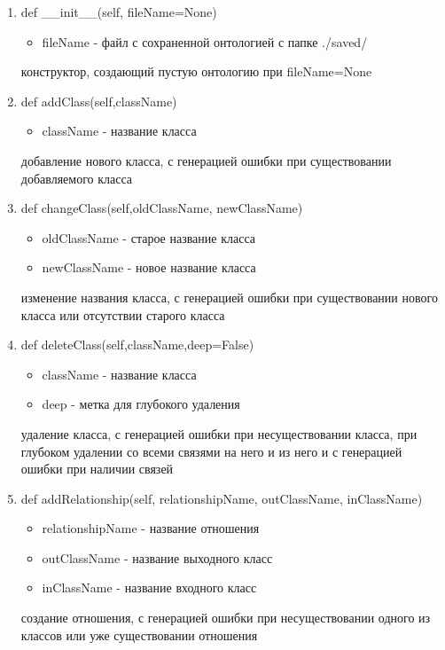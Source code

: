 \documentclass{article}
\begin{document}
	\begin{enumerate}
	\item def \_\_init\_\_(self, fileName=None)
		\begin{itemize}
			\item fileName - файл с сохраненной онтологией с папке ./saved/
		\end{itemize}
		конструктор, создающий пустую онтологию при fileName=None
	
	\item def addClass(self,className)
	\begin{itemize}
		\item className - название класса
	\end{itemize}
	добавление нового класса, с генерацией ошибки при существовании добавляемого класса
	
	\item def changeClass(self,oldClassName, newClassName)
	\begin{itemize}
		\item oldClassName - старое название класса
		\item newClassName - новое название класса
	\end{itemize}
	изменение названия класса, с генерацией ошибки при существовании нового класса или отсутствии старого класса
	
	\item def deleteClass(self,className,deep=False)
	\begin{itemize}
		\item className - название класса
		\item deep - метка для глубокого удаления
	\end{itemize}
	удаление класса, с генерацией ошибки при несуществовании класса, при глубоком удалении со всеми связями на него и из него и с генерацией ошибки при наличии связей
	
	\item def addRelationship(self, relationshipName, outClassName, inClassName)
	\begin{itemize}
		\item relationshipName - название отношения
		\item outClassName - название выходного класс
		\item inClassName - название входного класс
	\end{itemize}
	создание отношения, с генерацией ошибки при несуществовании одного из классов или уже существовании отношения
	

\end{enumerate}
\end{document}
